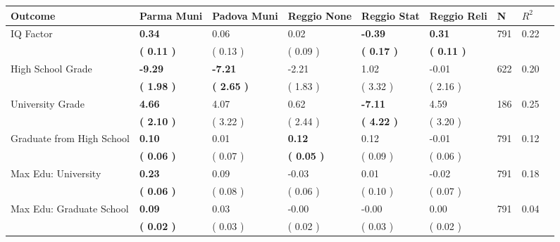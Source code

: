 \begin{tabular}{L{6.2cm} C{1.8cm} C{1.8cm} C{1.8cm} C{1.8cm} C{1.8cm} C{1.8cm} C{0.3cm} C{0.3cm}}
\toprule
 \textbf{Outcome} & \textbf{Parma Muni} & \textbf{Padova Muni} & \textbf{Reggio None} & \textbf{Reggio Stat} & \textbf{Reggio Reli} & \textbf{N} & \textbf{$ R^2$} \\
\midrule
IQ Factor & \textbf{     0.34} &      0.06 &      0.02 & \textbf{    -0.39} & \textbf{     0.31}  & 791 &       0.22 \\ 
 & \textbf{(     0.11 )} & (     0.13 ) & (     0.09 ) & \textbf{(     0.17 )} & \textbf{(     0.11 )}  & \\
High School Grade & \textbf{    -9.29} & \textbf{    -7.21} &     -2.21 &      1.02 &     -0.01  & 622 &       0.20 \\ 
 & \textbf{(     1.98 )} & \textbf{(     2.65 )} & (     1.83 ) & (     3.32 ) & (     2.16 )  & \\
University Grade & \textbf{     4.66} &      4.07 &      0.62 & \textbf{    -7.11} &      4.59  & 186 &       0.25 \\ 
 & \textbf{(     2.10 )} & (     3.22 ) & (     2.44 ) & \textbf{(     4.22 )} & (     3.20 )  & \\
Graduate from High School & \textbf{     0.10} &      0.01 & \textbf{     0.12} &      0.12 &     -0.01  & 791 &       0.12 \\ 
 & \textbf{(     0.06 )} & (     0.07 ) & \textbf{(     0.05 )} & (     0.09 ) & (     0.06 )  & \\
Max Edu: University & \textbf{     0.23} &      0.09 &     -0.03 &      0.01 &     -0.02  & 791 &       0.18 \\ 
 & \textbf{(     0.06 )} & (     0.08 ) & (     0.06 ) & (     0.10 ) & (     0.07 )  & \\
Max Edu: Graduate School & \textbf{     0.09} &      0.03 &     -0.00 &     -0.00 &      0.00  & 791 &       0.04 \\ 
 & \textbf{(     0.02 )} & (     0.03 ) & (     0.02 ) & (     0.03 ) & (     0.02 )  & \\
\bottomrule
\end{tabular}

